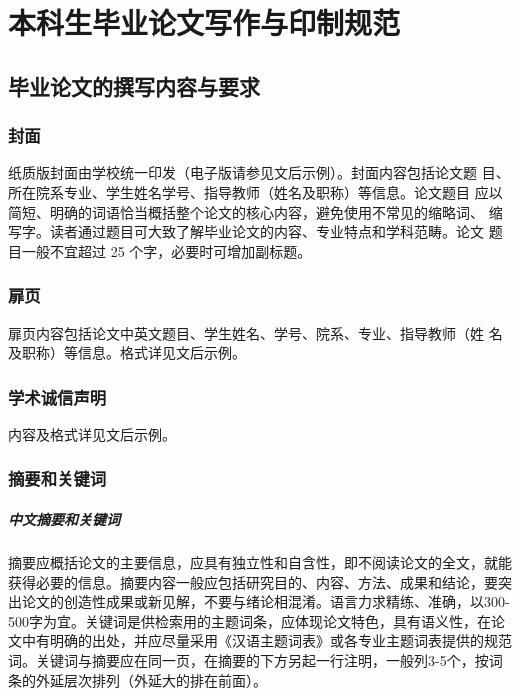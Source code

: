 
\chapter{本科生毕业论文写作与印制规范}\label{chapter-2}

\section{毕业论文的撰写内容与要求}

\subsection{封面}

纸质版封面由学校统一印发（电子版请参见文后示例）。封面内容包括论文题
目、所在院系专业、学生姓名学号、指导教师（姓名及职称）等信息。论文题目
应以简短、明确的词语恰当概括整个论文的核心内容，避免使用不常见的缩略词、
缩写字。读者通过题目可大致了解毕业论文的内容、专业特点和学科范畴。论文
题目一般不宜超过 25 个字，必要时可增加副标题。

\subsection{扉页}

扉页内容包括论文中英文题目、学生姓名、学号、院系、专业、指导教师（姓
名及职称）等信息。格式详见文后示例。

\subsection{学术诚信声明}

内容及格式详见文后示例。

\subsection{摘要和关键词}

\paragraph{中文摘要和关键词}

摘要应概括论文的主要信息，应具有独立性和自含性，即不阅读论文的全文，就能获得必要的信息。摘要内容一般应包括研究目的、内容、方法、成果和结论，要突出论文的创造性成果或新见解，不要与绪论相混淆。语言力求精练、准确，以300-500字为宜。关键词是供检索用的主题词条，应体现论文特色，具有语义性，在论文中有明确的出处，并应尽量采用《汉语主题词表》或各专业主题词表提供的规范词。关键词与摘要应在同一页，在摘要的下方另起一行注明，一般列3-5个，按词条的外延层次排列（外延大的排在前面）。

